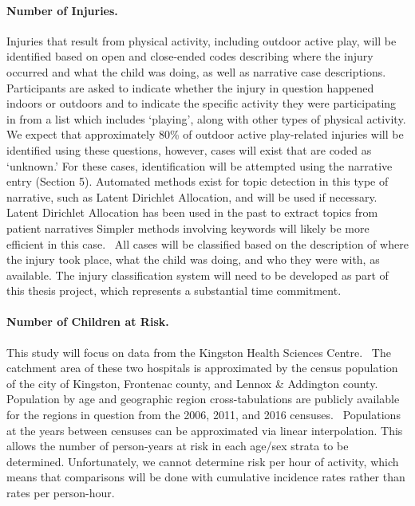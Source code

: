 \documentclass [11pt]{article}
\begin{document}
\paragraph{Number of Injuries.} Injuries that result from physical activity, including outdoor active play, will be identified based on open and close-ended codes describing where the injury occurred and what the child was doing, as well as narrative case descriptions. Participants are asked to indicate whether the injury in question happened indoors or outdoors and to indicate the specific activity they were participating in from a list which includes `playing', along with other types of physical activity. We expect that approximately 80\% of outdoor active play-related injuries will be identified using these questions, however, cases will exist that are coded as `unknown.' For these cases, identification will be attempted using the narrative entry (Section 5). Automated methods exist for topic detection in this type of narrative, such as Latent Dirichlet Allocation\cite{Blei2003-ob}, and will be used if necessary. Latent Dirichlet Allocation has been used in the past to extract topics from patient narratives \cite{Hassanali2013-va,Cohen2014-fd} Simpler methods involving keywords will likely be more efficient in this case.~\cite{Fridman2013-wq} All cases will be classified based on the description of where the injury took place, what the child was doing, and who they were with, as available. The injury classification system will need to be developed as part of this thesis project, which represents a substantial time commitment.

\paragraph{Number of Children at Risk.} This study will focus on data from the Kingston Health Sciences Centre.~\cite{Pickett2003-zj} The catchment area of these two hospitals is approximated by the census population of the city of Kingston, Frontenac county, and Lennox \& Addington county.~\cite{Pickett2003-zj} Population by age and geographic region cross-tabulations are publicly available for the regions in question from the 2006, 2011, and 2016 censuses.~\cite{Government_of_Canada2007-zb,Government_of_Canada2017-iu} Populations at the years between censuses can be approximated via linear interpolation. This allows the number of person-years at risk in each age/sex strata to be determined. Unfortunately, we cannot determine risk per hour of activity, which means that comparisons will be done with cumulative incidence rates rather than rates per person-hour. 
\end{document}
